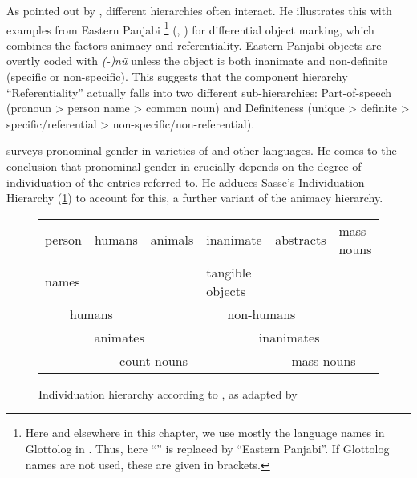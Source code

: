 \documentclass[output=collectionpaper]{langsci/langscibook}
\begin{document}
%

\sloppy
As pointed out by \cite[166]{Croft2003}, different hierarchies often interact. He illustrates this with examples from Eastern Panjabi%
\footnote{%
Here and elsewhere in this chapter, we use mostly the language names in Glottolog in \cite{Hammarstroem2018}. Thus, here ``'' is replaced by ``Eastern Panjabi''. If Glottolog names are not used, these are given in brackets.
} %
(, ) for differential object marking, which combines the factors animacy and referentiality. Eastern Panjabi objects are overtly coded with \textit{(-)nũ} unless the object is both inanimate and non-definite (specific or non-specific). This suggests that the component hierarchy ``Referentiality'' actually falls into two different  sub-hierarchies:
Part-of-speech
(pronoun > person name > common noun) 
and Definiteness
(unique > definite > specific/referential > non-specific/non-referential).


\cite{Siemund2008} surveys pronominal gender in varieties of  and other languages. He comes to the conclusion that pronominal gender in  crucially depends on the degree of individuation of the entries referred to. He adduces Sasse's Individuation Hierarchy (\ref{fig:WDG:1}) to account for this, a further variant of the animacy hierarchy.

\begin{figure}[htb]
\begin{tabular}{|l|l|l|l|l|l|}
\hline person &	humans &	animals &	inanimate  &	abstracts	& mass nouns \\
names & & & tangible objects & & \\
\hline \multicolumn{2}{|c|}{humans} &	\multicolumn{4}{c|}{non-humans} \\
\hline \multicolumn{3}{|c|}{animates} &	\multicolumn{3}{c|}{inanimates} \\
\hline \multicolumn{4}{|c|}{count nouns} &	\multicolumn{2}{c|}{mass nouns} \\
\hline
\end{tabular}
\caption{Individuation hierarchy according to \cite[659]{Sasse1993}, as adapted by \citet[90]{Karatsareas2014}}
\label{fig:WDG:1}
\end{figure}
\end{document}
